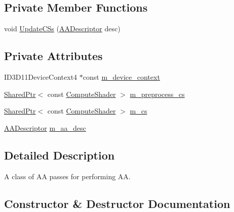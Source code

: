 \subsection*{Private Member Functions}
\begin{DoxyCompactItemize}
\item 
void \hyperlink{classmage_1_1_a_a_pass_ac48a68cdacf75cdf339e8f009e0c2bad}{Update\+C\+Ss} (\hyperlink{namespacemage_a86cd40b8f2f42ca4d616cc6ec665a7f2}{A\+A\+Descriptor} desc)
\end{DoxyCompactItemize}
\subsection*{Private Attributes}
\begin{DoxyCompactItemize}
\item 
I\+D3\+D11\+Device\+Context4 $\ast$const \hyperlink{classmage_1_1_a_a_pass_ae5a0a1323cfbb03adeb444e2972c7159}{m\+\_\+device\+\_\+context}
\item 
\hyperlink{namespacemage_a1e01ae66713838a7a67d30e44c67703e}{Shared\+Ptr}$<$ const \hyperlink{namespacemage_ae040329401484b076f0cd1a7c43d19c9}{Compute\+Shader} $>$ \hyperlink{classmage_1_1_a_a_pass_a9b8a50f0e4b21ae3f558cb010acfa3b1}{m\+\_\+preprocess\+\_\+cs}
\item 
\hyperlink{namespacemage_a1e01ae66713838a7a67d30e44c67703e}{Shared\+Ptr}$<$ const \hyperlink{namespacemage_ae040329401484b076f0cd1a7c43d19c9}{Compute\+Shader} $>$ \hyperlink{classmage_1_1_a_a_pass_aca04ca410ab5c0d1cd4270f2c7ccfe1c}{m\+\_\+cs}
\item 
\hyperlink{namespacemage_a86cd40b8f2f42ca4d616cc6ec665a7f2}{A\+A\+Descriptor} \hyperlink{classmage_1_1_a_a_pass_a2c821aa79093054a95debe6540abd58c}{m\+\_\+aa\+\_\+desc}
\end{DoxyCompactItemize}


\subsection{Detailed Description}
A class of AA passes for performing AA. 

\subsection{Constructor \& Destructor Documentation}
\hypertarget{classmage_1_1_a_a_pass_a252ae39e2a24d3c82294aa9f308877b1}{}\label{classmage_1_1_a_a_pass_a252ae39e2a24d3c82294aa9f308877b1} 
